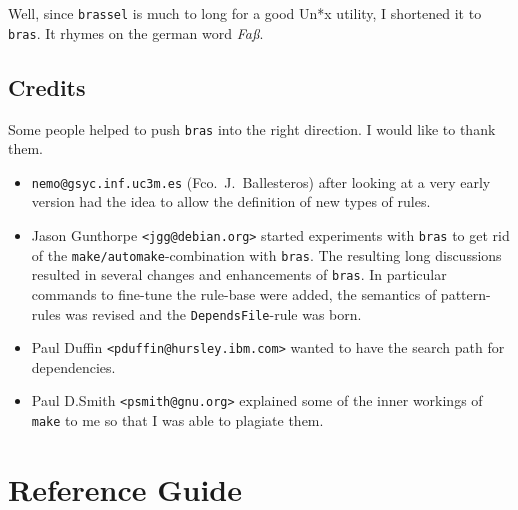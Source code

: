 \documentclass[11pt,bibtotoc,idxtotoc]{scrreprt}
\newcommand{\bras}{\texttt{bras}}
\newcommand{\make}{\texttt{make}}
\begin{document}
Well, since \texttt{brassel} is much to long for a good
Un*x utility, I shortened it to \bras. It rhymes on the german word
\textit{Fa\ss}.

\section{Credits}

Some people helped to push \bras{} into the right direction. I
would like to thank them. 

\begin{itemize}
\item \texttt{nemo@gsyc.inf.uc3m.es} (Fco.\ J.~Ballesteros) after
looking at a very early version had the
idea to allow the definition of new types of rules.

\item Jason Gunthorpe \texttt{<jgg@debian.org>} started experiments
  with \bras{} to get rid of the \texttt{make/automake}-combination
  with \bras{}. The resulting long discussions resulted in several
  changes and enhancements of \bras{}. In particular commands to
  fine-tune the rule-base were added, the semantics of pattern-rules
  was revised and the \texttt{DependsFile}-rule was born.
  
\item Paul Duffin \texttt{<pduffin@hursley.ibm.com>} wanted to have
  the search path for dependencies.
  
\item Paul D.Smith \texttt{<psmith@gnu.org>} explained some of the
  inner workings of \make{} to me so that I was able to plagiate them.
\end{itemize}

\chapter{Reference Guide}

\newcommand{\Tt}[1]{\texttt{#1}}
\newcommand{\It}[1]{\textit{#1}}
\newcommand{\Flash}[1]{\fbox{\bfseries #1}}
\newcommand{\Sflabel}[1]{%
  \parbox[b]{\labelwidth}{%
    \makebox[1pt][l]{\textsf{\bfseries#1:}}\\\strut}}
  
\newenvironment{Describe}
{\vskip0pt plus2cm\begin{list}{}{\renewcommand{\makelabel}{\Sflabel}}}
{\end{list}\pagebreak[2]}
\end{document}
